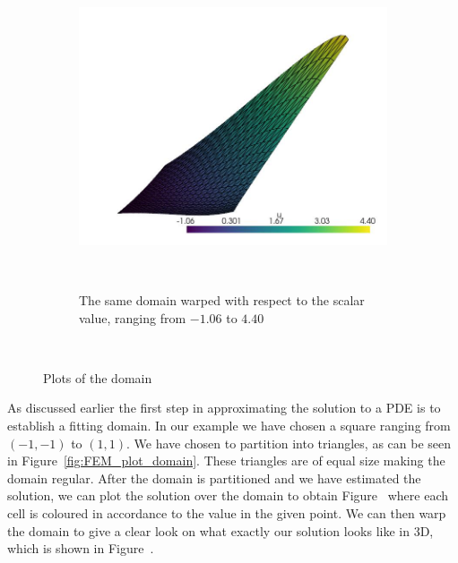 \begin{figure}[ht]
\begin{subfigure}{.49\textwidth}
    \end{subfigure}
    \begin{subfigure}{.49\textwidth}
        \centering
        \includegraphics[width=\textwidth]{Afsnit/Application/figurer/screenshot_3.jpeg}
        \caption{The same domain warped with respect to the scalar value, ranging from $-1.06$ to $4.40$}~\label{fig:FEM_plot_3D}
    \end{subfigure}
    \caption{Plots of the domain}~\label{fig:FEM_plots}
\end{figure}

As discussed earlier the first step in approximating the solution to a PDE is to establish a fitting domain. In our example we have chosen a square ranging from $(-1,-1)$ to $(1,1)$.
We have chosen to partition into triangles, as can be seen
in Figure~\ref{fig:FEM_plot_domain}. 
These triangles are of equal size making the domain regular.
After the domain is partitioned and we have estimated the solution,
we can plot the solution over the domain to obtain Figure~ 
where each cell is coloured in accordance to the value in the given point.
We can then warp the domain to give a clear look on what exactly our solution looks like in 3D, 
which is shown in Figure~.
